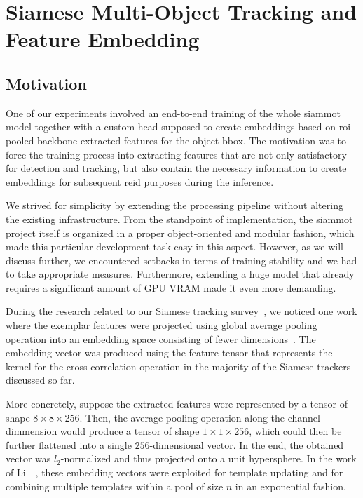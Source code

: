 \section{Siamese Multi-Object Tracking and Feature Embedding}
\label{sec:SiamMOTandFeatureEmb}

\subsection{Motivation}

One of our experiments involved an end-to-end training of the whole \gls{siammot} model together with a custom head supposed to create embeddings based on \gls{roi}-pooled backbone-extracted features for the object \gls{bbox}. The motivation was to force the training process into extracting features that are not only satisfactory for detection and tracking, but also contain the necessary information to create embeddings for subsequent \gls{reid} purposes during the inference.

We strived for simplicity by extending the processing pipeline without altering the existing infrastructure. From the standpoint of implementation, the \gls{siammot} project itself is organized in a proper object-oriented and modular fashion, which made this particular development task easy in this aspect. However, as we will discuss further, we encountered setbacks in terms of training stability and we had to take appropriate measures. Furthermore, extending a huge model that already requires a significant amount of GPU VRAM made it even more demanding.

During the research related to our Siamese tracking survey~\cite{ondrasovic2021siamese}, we noticed one work where the exemplar features were projected using global average pooling operation into an embedding space consisting of fewer dimensions~\cite{li2020figsiam}. The embedding vector was produced using the feature tensor that represents the kernel for the cross-correlation operation in the majority of the Siamese trackers discussed so far.

More concretely, suppose the extracted features were represented by a tensor of shape $8 \times 8 \times 256$. Then, the average pooling operation along the channel dimmension would produce a tensor of shape $1 \times 1 \times 256$, which could then be further flattened into a single $256$-dimensional vector. In the end, the obtained vector was $l_2$-normalized and thus projected onto a unit hypersphere. In the work of Li~\etal{}~\cite{li2020figsiam}, these embedding vectors were exploited for template updating and for combining multiple templates within a pool of size $n$ in an exponential fashion.

